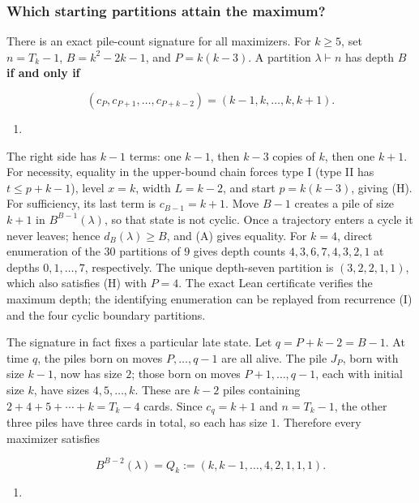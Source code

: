 \documentclass[11pt,a4paper]{article}
\providecommand{\tightlist}{\setlength{\itemsep}{0pt}\setlength{\parskip}{0pt}}
\begin{document}
\subsubsection{Which starting partitions attain the maximum?}\label{which-starting-partitions-attain-the-maximum}

There is an exact pile-count signature for all maximizers. For \(k\ge5\), set \(n=T_k-1\), \(B=k^2-2k-1\), and \(P=k(k-3)\). A partition \(\lambda\vdash n\) has depth \(B\) \textbf{if and only if}

\[
\boxed{(c_P,c_{P+1},\ldots,c_{P+k-2})
       =(k-1,k,\ldots,k,k+1).}
\]

\begin{enumerate}
\def\labelenumi{(\Alph{enumi})}
\setcounter{enumi}{7}
\tightlist
\item
\end{enumerate}

The right side has \(k-1\) terms: one \(k-1\), then \(k-3\) copies of \(k\), then one \(k+1\). For necessity, equality in the upper-bound chain forces type I (type II has \(t\le p+k-1\)), level \(x=k\), width \(L=k-2\), and start \(p=k(k-3)\), giving (H). For sufficiency, its last term is \(c_{B-1}=k+1\). Move \(B-1\) creates a pile of size \(k+1\) in \(B^{B-1}(\lambda)\), so that state is not cyclic. Once a trajectory enters a cycle it never leaves; hence \(d_B(\lambda)\ge B\), and (A) gives equality. For \(k=4\), direct enumeration of the 30 partitions of \(9\) gives depth counts \(4,3,6,7,4,3,2,1\) at depths \(0,1,\ldots,7\), respectively. The unique depth-seven partition is \((3,2,2,1,1)\), which also satisfies (H) with \(P=4\). The exact Lean certificate verifies the maximum depth; the identifying enumeration can be replayed from recurrence (I) and the four cyclic boundary partitions.

The signature in fact fixes a particular late state. Let \(q=P+k-2=B-1\). At time \(q\), the piles born on moves \(P,\ldots,q-1\) are all alive. The pile \(J_P\), born with size \(k-1\), now has size \(2\); those born on moves \(P+1,\ldots,q-1\), each with initial size \(k\), have sizes \(4,5,\ldots,k\). These are \(k-2\) piles containing \(2+4+5+\cdots+k=T_k-4\) cards. Since \(c_q=k+1\) and \(n=T_k-1\), the other three piles have three cards in total, so each has size \(1\). Therefore every maximizer satisfies

\[
B^{B-2}(\lambda)=Q_k:=(k,k-1,\ldots,4,2,1,1,1).
\]

\begin{enumerate}
\def\labelenumi{(\Alph{enumi})}
\setcounter{enumi}{9}
\tightlist
\item
\end{enumerate}
\end{document}
